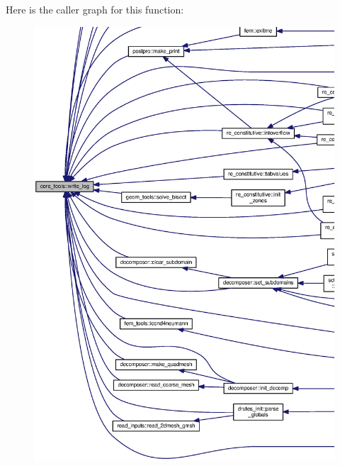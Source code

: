 Here is the caller graph for this function\+:\nopagebreak
\begin{figure}[H]
\begin{center}
\leavevmode
\includegraphics[width=350pt]{namespacecore__tools_abe09f9b4dc2abc5384a24020c5031e95_icgraph}
\end{center}
\end{figure}


